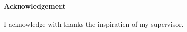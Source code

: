 \documentclass[class=article, crop=false]{standalone}
\begin{document}
\paragraph{Acknowledgement}
I acknowledge with thanks the inspiration of my supervisor.
\end{document}
